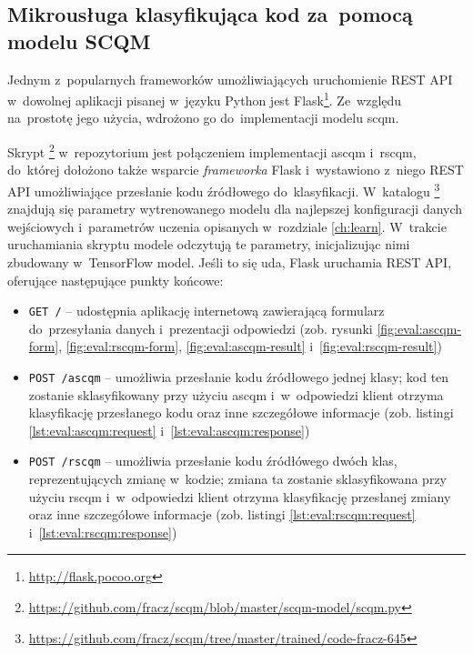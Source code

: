 \documentclass[twoside]{praca}
\begin{document}
\subsection{Mikrousługa klasyfikująca kod za~pomocą modelu SCQM}

Jednym z~popularnych frameworków umożliwiających uruchomienie REST API w~dowolnej aplikacji pisanej w~języku Python jest Flask\footnote{\url{http://flask.pocoo.org}}. Ze~względu na~prostotę jego użycia, wdrożono go do~implementacji modelu \gls{scqm}.

Skrypt \footnote{\url{https://github.com/fracz/scqm/blob/master/scqm-model/scqm.py}} w~repozytorium \cite{fracz:scqm} jest połączeniem implementacji \gls{ascqm} i~\gls{rscqm}, do~której dołożono także wsparcie \textit{frameworka} Flask i~wystawiono z~niego REST API umożliwiające przesłanie kodu źródłowego do~klasyfikacji. W~katalogu \footnote{\url{https://github.com/fracz/scqm/tree/master/trained/code-fracz-645}} znajdują się parametry wytrenowanego modelu dla najlepszej konfiguracji danych wejściowych i~parametrów uczenia opisanych w~rozdziale \ref{ch:learn}. W~trakcie uruchamiania skryptu modele odczytują te parametry, inicjalizując nimi zbudowany w~TensorFlow model. Jeśli to się uda, Flask uruchamia REST API, oferujące następujące punkty końcowe:

\begin{itemize}
    \item \texttt{GET /} -- udostępnia aplikację internetową zawierającą formularz do~przesyłania danych i~prezentacji odpowiedzi (zob. rysunki \ref{fig:eval:ascqm-form}, \ref{fig:eval:rscqm-form}, \ref{fig:eval:ascqm-result} i~\ref{fig:eval:rscqm-result})
    \item \texttt{POST /ascqm} -- umożliwia przesłanie kodu źródłowego jednej klasy; kod ten zostanie sklasyfikowany przy użyciu \gls{ascqm} i~w~odpowiedzi klient otrzyma klasyfikację przesłanego kodu oraz inne szczegółowe informacje (zob. listingi \ref{lst:eval:ascqm:request} i~\ref{lst:eval:ascqm:response})
    \item \texttt{POST /rscqm} -- umożliwia przesłanie kodu źródłówego dwóch klas, reprezentujących zmianę w~kodzie; zmiana ta zostanie sklasyfikowana przy użyciu \gls{rscqm} i~w~odpowiedzi klient otrzyma klasyfikację przesłanej zmiany oraz inne szczegółowe informacje (zob. listingi \ref{lst:eval:rscqm:request} i~\ref{lst:eval:rscqm:response})
\end{itemize}
\end{document}
